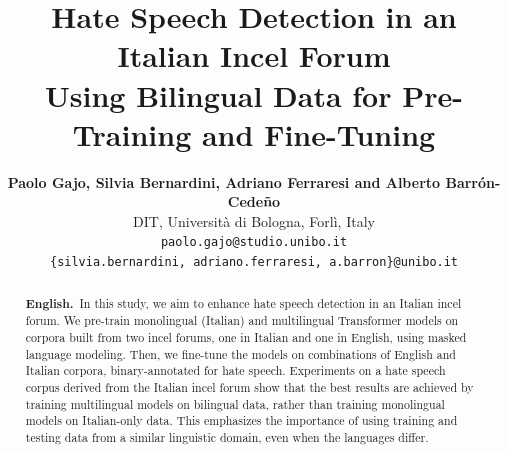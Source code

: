 \documentclass[11pt]{article}
\title{Hate Speech Detection in an Italian Incel Forum \\ Using Bilingual Data for Pre-Training and Fine-Tuning}
\author{\textbf{Paolo Gajo, Silvia Bernardini, Adriano Ferraresi and Alberto Barr\'on-Cede\~no} \\
  DIT, Universit\`a di Bologna, Forl\`i, Italy \\
  {\tt paolo.gajo@studio.unibo.it}\\
  {\tt \{silvia.bernardini, adriano.ferraresi, a.barron\}@unibo.it}}
\date{}
\begin{document}
\maketitle
\begin{abstract}
\textbf{English.}~In this study, we aim to enhance hate speech detection in an Italian incel forum.
We pre-train monolingual (Italian) and multilingual Transformer models on corpora built from two incel forums, one in Italian and one in English, using masked language modeling. Then, we fine-tune the models on combinations of English and Italian corpora, binary-annotated for hate speech.
Experiments on a hate speech corpus derived from the Italian incel forum show that the best results are achieved by training multilingual models on bilingual data,
rather than training monolingual models on Italian-only data. This emphasizes the importance of using training and testing data from a similar linguistic domain, even when the languages differ.


\end{abstract}
\end{document}
